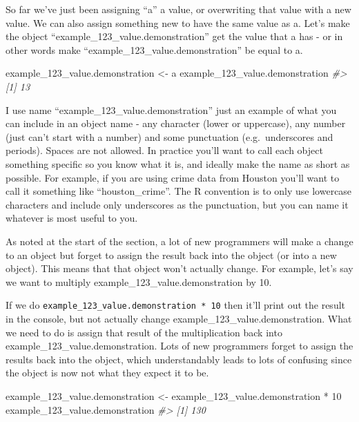 \documentclass[
]{krantz}
\makeatletter
\newenvironment{Shaded}{\begin{snugshade}}{\end{snugshade}}
\newcommand{\CommentTok}[1]{\textcolor[rgb]{0.37,0.37,0.37}{\textit{#1}}}
\newcommand{\DecValTok}[1]{\textcolor[rgb]{0.06,0.06,0.06}{#1}}
\newcommand{\NormalTok}[1]{#1}
\newcommand{\OtherTok}[1]{\textcolor[rgb]{0.37,0.37,0.37}{#1}}
\newcommand{\SpecialCharTok}[1]{\textcolor[rgb]{0,0,0}{#1}}
\newenvironment{kframe}{%
\medskip{}
\setlength{\fboxsep}{.8em}
 \def\at@end@of@kframe{}%
 \ifinner\ifhmode%
  \def\at@end@of@kframe{\end{minipage}}%
  \begin{minipage}{\columnwidth}%
 \fi\fi%
 \def\FrameCommand##1{\hskip\@totalleftmargin \hskip-\fboxsep
 \colorbox{shadecolor}{##1}\hskip-\fboxsep
     \hskip-\linewidth \hskip-\@totalleftmargin \hskip\columnwidth}%
 \MakeFramed {\advance\hsize-\width
   \@totalleftmargin\z@ \linewidth\hsize
   \@setminipage}}%
 {\par\unskip\endMakeFramed%
 \at@end@of@kframe}
\renewenvironment{Shaded}{\begin{kframe}}{\end{kframe}}
\makeatother
\begin{document}
So far we've just been assigning ``a'' a value, or overwriting that value with a new value. We can also assign something new to have the same value as a. Let's make the object ``example\_123\_value.demonstration'' get the value that a has - or in other words make ``example\_123\_value.demonstration'' be equal to a.

\begin{Shaded}
\begin{Highlighting}[]
\NormalTok{example\_123\_value.demonstration }\OtherTok{\textless{}{-}}\NormalTok{ a}
\NormalTok{example\_123\_value.demonstration}
\CommentTok{\#\textgreater{} [1] 13}
\end{Highlighting}
\end{Shaded}

I use name ``example\_123\_value.demonstration'' just an example of what you can include in an object name - any character (lower or uppercase), any number (just can't start with a number) and some punctuation (e.g.~underscores and periods). Spaces are not allowed. In practice you'll want to call each object something specific so you know what it is, and ideally make the name as short as possible. For example, if you are using crime data from Houston you'll want to call it something like ``houston\_crime''. The R convention is to only use lowercase characters and include only underscores as the punctuation, but you can name it whatever is most useful to you.

As noted at the start of the section, a lot of new programmers will make a change to an object but forget to assign the result back into the object (or into a new object). This means that that object won't actually change. For example, let's say we want to multiply example\_123\_value.demonstration by 10.

If we do \texttt{example\_123\_value.demonstration\ *\ 10} then it'll print out the result in the console, but not actually change example\_123\_value.demonstration. What we need to do is assign that result of the multiplication back into example\_123\_value.demonstration. Lots of new programmers forget to assign the results back into the object, which understandably leads to lots of confusing since the object is now not what they expect it to be.

\begin{Shaded}
\begin{Highlighting}[]
\NormalTok{example\_123\_value.demonstration }\OtherTok{\textless{}{-}}\NormalTok{ example\_123\_value.demonstration }\SpecialCharTok{*} \DecValTok{10}
\NormalTok{example\_123\_value.demonstration}
\CommentTok{\#\textgreater{} [1] 130}
\end{Highlighting}
\end{Shaded}
\end{document}
